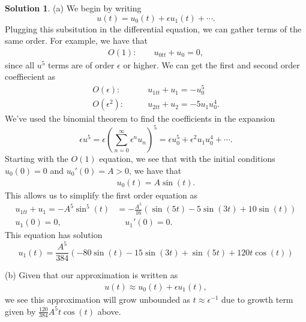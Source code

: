 \documentclass[12pt]{article}
\theoremstyle{definition}
\newtheorem{sol}{Solution}
\theoremstyle{remark}
\begin{document}
\begin{sol}
    (a) We begin by writing 
    \begin{equation*}
        u(t) = u_{0}(t) + \epsilon u_{1}(t) + \cdots.
    \end{equation*}
    Plugging this subsitution in the differential equation, we can gather terms of the same order. For example, we have that
    \begin{align*}
        O(1): \quad \quad u_{0 tt} + u_{0} = 0,
    \end{align*}
    since all $u^{5}$ terms are of order $\epsilon$ or higher. We can get the first and second order coeffiecient as
    \begin{align*}
        O(\epsilon):& \quad \quad u_{1tt} + u_{1} = - u_{0}^{5} \\
        O(\epsilon^{2}):& \quad \quad u_{2tt} + u_{2} = - 5 u_{1} u_{0}^{4}. 
    \end{align*}
    We've used the binomial theorem to find the coefficients in the expansion 
\begin{equation*}
    \epsilon u^{5} = \epsilon \left( \sum_{n=0}^{\infty} \epsilon^{n} u_{n} \right)^{5} = \epsilon u_{0}^{5} + \epsilon^{2} u_{1} u_{0}^{4} + \cdots.
\end{equation*}
Starting with the $O(1)$ equation, we see that with the initial conditions $u_{0}(0) = 0$ and $u_{0}'(0) = A > 0$, we have that
\begin{align*}
    u_{0}(t) = A \sin(t).
\end{align*}
This allows us to simplify the first order equation as
\begin{align*}
    u_{1tt} + u_{1} = - A^{5} \sin^{5}(t) &= -\frac{A^{5}}{16} (\sin(5t) - 5\sin(3t) + 10 \sin(t))\\
    u_{1}(0) = 0, &\quad  u_{1}'(0) = 0.
\end{align*}
This equation has solution
\begin{equation*}
    u_{1}(t) = \frac{A^{5}}{384}\left( - 80\sin(t) - 15 \sin(3t) + \sin(5t) + 120 t \cos(t) \right)
\end{equation*}

(b) Given that our approximation is written as
\begin{align*}
    u(t) \approx u_{0}(t) + \epsilon u_{1}(t),
\end{align*}
we see this approximation will grow unbounded as $t \approx \epsilon^{-1}$ due to growth term given by $\frac{120}{384} A^{5} t \cos(t)$ above.


\end{sol}
\end{document}
